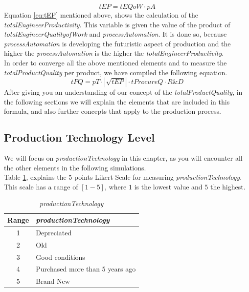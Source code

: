 \begin{equation}
tEP=tEQoW \cdot pA
\label{eq:tEP}
\end{equation}
Equation \ref{eq:tEP} mentioned above, shows the calculation of the \textit{totalEngineerProductivity}. This variable is given the value of the product of \textit{totalEngineerQualityofWork} and \textit{processAutomation}. It is done so, because \textit{processAutomation} is developing the futuristic  aspect of production and the higher the \textit{processAutomation} is the higher the \textit{totalEngineerProductivity}. \\

In order to converge all the above mentioned elements and to measure the \textit{totalProductQuality} per product, we have compiled the following equation. 
\begin{equation}
tPQ = pT \cdot |\sqrt{tEP}| \cdot tProcureQ \cdot R\&D 
\label{eq:PQ}
\end{equation}
After giving you an understanding of our concept of the \textit{totalProductQuality}, in the following sections we will explain the elements that  are included in this formula, and also further concepts that apply to the production process.

\subsection{Production Technology Level}
We will focus on \textit{productionTechnology} in this chapter, as you will encounter all the other elements in the following simulations. \\
Table \ref{table:my-label}, explains the $5$ points Likert-Scale for measuring \textit{productionTechnology}. This scale has a range of $[1-5]$, where $1$ is the lowest value and $5$ the highest.

\begin{table}[ht]
\centering
\begin{tabular}{|c|l|}
\hline
 Range & \textit{productionTechnology}\\
\hline
 1 & Depreciated  \\
 2 & Old \\
 3 & Good conditions \\
 4 & Purchased more than 5 years ago  \\
 5 & Brand New\\
\hline
\end{tabular}
\caption{\textit{productionTechnology}}
\label{table:my-label}
\end{table}

